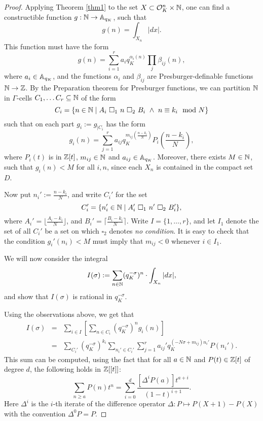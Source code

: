 \begin{proof}


Applying Theorem \ref{thm1} to the set $X \subset \cO_K^n\times \NN$, one can find a constructible function $g: \NN \to \AA_{q_K}$, such that
\[g(n) = \int_{X_n}|dx|.\]
This function must have the form 
\[g(n) = \sum_{i=1}^r a_iq_K^{\alpha_i(n)}\prod_j\beta_{ij}(n),\]
where $a_i \in \AA_{q_K}$, and the functions $\alpha_i$ and $\beta_{ij}$ are Presburger-definable functions $\NN \to \ZZ$. By the Preparation theorem for Presburger functions, we can partition $\N$ in $\Gamma$-cells $C_1, \ldots C_r \subseteq \N$ of the form
\[C_i = \{ n \in \N \mid A_i \ \square_1 \ n \ \square_2\ B_i \ \wedge\ n \equiv k_i \mod N \}\]
 such that on each part $g_i:= g_{|C_i}$ has the form 
\[g_i(n) = \sum_{j=1}^r a_{ij}q_K^{m_{ij}(\frac{n-k_i}{N})}P_i\left(\frac{n-k_i}{N}\right),\]
where $P_i(t)$ is in $\Z[t]$, $m_{ij} \in \N$ and $a_{ij} \in \AA_{q_K}$. Moreover, there exists $M \in \N$, such that $g_i(n) <M$ for all $i,n$, since each $X_n$ is contained in the compact set $D$.
 
Now put $n_i' := \frac{n-k_i}{N}$, and write $C_i'$ for the set
\[C_i'=\{n_i'\in \N \mid A_i'\ \square_1 \ n' \ \square_2 \ B_i'\},\]
where $A_i' =\lfloor \frac{A_i-k_i}{N}\rfloor$, and $B_i' =\lceil \frac{B_i-k_i}{N}\rceil$. Write $I = \{1, \ldots, r\}$, and let $I_1$ denote the set of all $C_i'$ be a set on which $\square_2$ denotes \emph{no condition}. It is easy to check that the condition $g_i'(n_i) <M$ must imply that $m_{ij}<0$ whenever $i \in I_1$.  

We will now consider the integral
\[I(\sigma):=\sum_{n\in\NN}(q_K^{-\sigma})^{n}\cdot \int_{X_n}|dx|,\] 
and show that $I(\sigma)$ is rational in $q_K^{-\sigma}$.

Using the observations above, we get that
\begin{eqnarray*}
I(\sigma) %
&=& \sum_{i\in I}\left[ \sum_{n \in C_i} (q_K^{-\sigma})^{n}g_i(n)\right]\\
&=&\sum_{C_i'}(q_K^{-\sigma})^{k_i} \sum_{n_i' \in C_i'}\sum_{j=1}^r a_{ij}'q_K^{(-N\sigma +m_{ij})n_i'}P(n_i').
\end{eqnarray*}
This sum can be computed, using the fact that for all $a \in \N$ and $P(t) \in \Z[t]$ of degree $d$, the following holds in $\Z[[t]]$:
\[\sum_{n \geqslant a} P(n)t^n =\sum_{i=0}^d	\frac{[\Delta^iP(a)]t^{a+i}}{(1 - t )^{i+1}}.\]
Here $\Delta^i$ is the $i$-th iterate of the difference operator $\Delta:P \mapsto P(X + 1) - P(X)$ with the convention $\Delta^0P = P$.


\end{proof}
